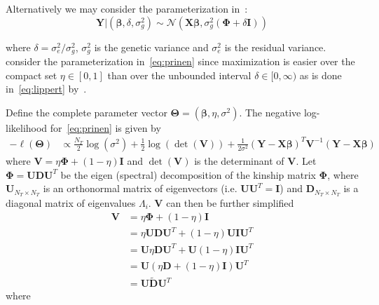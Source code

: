\documentclass[12pt,letter]{article}\usepackage[]{graphicx}\usepackage[]{color}
\newcommand{\bX}{\textbf{X}}
\newcommand{\bY}{\textbf{Y}}
\newcommand{\bD}{\textbf{D}}
\newcommand{\bU}{\textbf{U}}
\newcommand{\bV}{\textbf{V}}
\newcommand{\bI}{\textbf{I}}
\newcommand{\bTheta}{\boldsymbol{\Theta}}
\newcommand{\bbeta}{\boldsymbol{\beta}}
\newcommand{\bPhi}{\boldsymbol{\Phi}}
\begin{document}
Alternatively we may consider the parameterization in~\cite{lippert2011fast}:
\begin{equation}
	\bY | (\bbeta, \delta, \sigma_g^2) \sim \mathcal{N}(\bX \bbeta, \sigma_g^2(\bPhi + \delta\bI)) \label{eq:lippert}
\end{equation}

where $\delta = \sigma^2_e / \sigma^2_g$, $\sigma^2_g$ is the genetic variance and $\sigma^2_e$ is the residual variance. \cite{pirinen2013efficient} consider the parameterization in~\eqref{eq:prinen} since maximization is easier over the compact set $\eta \in [0,1]$ than over the unbounded interval $\delta \in [0, \infty)$ as is done in~\eqref{eq:lippert} by~\cite{lippert2011fast}.


Define the complete parameter vector $\bTheta = \left(\bbeta, \eta, \sigma^2 \right)$. The negative log-likelihood for~\eqref{eq:prinen} is given by
\begin{align}
	-\ell(\bTheta) & \propto \frac{N_T}{2}\log(\sigma^2) + \frac{1}{2}\log\left(\det(\bV)\right) + \frac{1}{2\sigma^2} \left(\bY - \bX \bbeta\right)^T \bV^{-1} \left(\bY - \bX \bbeta\right)  \label{eq:LogLike}
\end{align}
where $\bV = \eta \bPhi + (1-\eta) \bI$ and $\det(\bV)$ is the determinant of $\bV$. Let $\bPhi = \bU \bD \bU^T$ be the eigen (spectral) decomposition of the kinship matrix $\bPhi$, where $\bU_{N_T \times N_T}$ is an orthonormal matrix of eigenvectors (i.e. $\bU \bU^T = \bI$) and $\bD_{N_T \times N_T}$ is a diagonal matrix of eigenvalues $\Lambda_i$. $\bV$ can then be further simplified~\citep{pirinen2013efficient}
\begin{align}
	\bV & = \eta \bPhi + (1-\eta) \bI \nonumber \\
	& = \eta \bU \bD \bU^T + (1-\eta) \bU \bI \bU^T \nonumber \\
	& = \bU \eta  \bD \bU^T + \bU (1-\eta) \bI \bU^T \nonumber \\
	& = \bU \left(\eta  \bD + (1-\eta) \bI\right) \bU^T \nonumber \\
	& = \bU \widetilde{\bD} \bU^T  \label{eq:Vsimplified}
\end{align}
where
\end{document}
